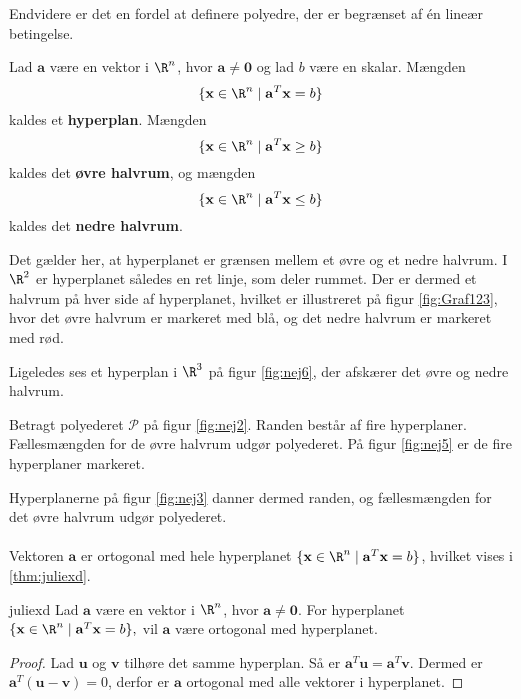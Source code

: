 Endvidere er det en fordel at definere polyedre, der er begrænset af én lineær betingelse. 
%
\begin{defn}{}{}
Lad $\mathbf{a}$ være en vektor i $\R^n$, hvor $\mathbf{a} \neq \mathbf{0}$ og lad $b$ være en skalar.
Mængden $$\{\textbf{x} \in \R^n \mid \mathbf{a}^T \mathbf{x}=b\}$$ kaldes et \textbf{hyperplan}.
%
Mængden $$\{\textbf{x} \in \R^n \mid \mathbf{a}^T \mathbf{x} \geq b\}$$ kaldes det \textbf{øvre halvrum}, og
mængden $$\{\textbf{x} \in \R^n \mid \mathbf{a}^T \mathbf{x} \leq b\}$$ kaldes det \textbf{nedre halvrum}.
\end{defn}
\noindent
%
Det gælder her, at hyperplanet er grænsen mellem et øvre og et nedre halvrum.
I $\R^2$ er hyperplanet således en ret linje, som deler rummet. 
Der er dermed et halvrum på hver side af hyperplanet, hvilket er illustreret på figur \ref{fig:Graf123}, hvor det øvre halvrum er markeret med blå, og det nedre halvrum er markeret med rød. 
%
%

%
Ligeledes ses et hyperplan i $\R^3$ på figur \ref{fig:nej6}, der afskærer det øvre og nedre halvrum.
%
%

%
Betragt polyederet $\mathcal{P}$ på figur \ref{fig:nej2}. 
Randen består af fire hyperplaner.
Fællesmængden for de øvre halvrum udgør polyederet.
På figur \ref{fig:nej5} er de fire hyperplaner markeret. 
%
%

%
Hyperplanerne på figur \ref{fig:nej3} danner dermed randen, og fællesmængden for det øvre halvrum udgør polyederet.
\\\\
%
%
%
Vektoren $\textbf{a}$ er ortogonal med hele hyperplanet $\{\textbf{x} \in \R^n \mid \mathbf{a}^T \mathbf{x}=b\}$, hvilket vises i \ref{thm:juliexd}. 
%
\begin{thm}{}{juliexd}
Lad $\mathbf{a}$ være en vektor i $\R^n$, hvor 
$\mathbf{a} \neq \mathbf{0}.$
For hyperplanet 
$\{\textbf{x} \in \R^n \mid \mathbf{a}^T \mathbf{x}=b\},$ 
vil $\mathbf{a}$ være ortogonal med hyperplanet.
\end{thm}
%
\begin{proof}
Lad $\mathbf{u}$ og $\mathbf{v}$ tilhøre det samme hyperplan. 
Så er $\mathbf{a}^T\textbf{u}=\mathbf{a}^T\textbf{v}.$
Dermed er $\mathbf{a}^T(\textbf{u}-\textbf{v})=0$, derfor er $\mathbf{a}$ ortogonal med alle vektorer i hyperplanet. 
\end{proof}